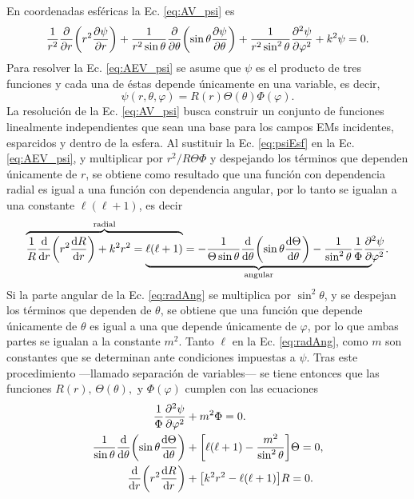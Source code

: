 En coordenadas esféricas la Ec. \eqref{eq:AV_psi} es
	\begin{equation}
	\frac{1}{r^2} \pdv{r}\qty(r^2\pdv{\psi}{r})+ 
	\frac{1}{r^2\sin\theta}\pdv{\theta}\qty(\sin\theta\pdv{\psi}{\theta})
	 + \frac{1}{r^2\sin^2\theta}\pdv[2]{\psi}{\varphi} + k^2 \psi =0. \label{eq:AEV_psi}
	\end{equation}
Para resolver la Ec. \eqref{eq:AEV_psi} se asume que $\psi$ es el producto de tres funciones y cada una de éstas depende únicamente en una variable, es decir,
	\begin{equation}
	\psi (r,\theta, \varphi) = R(r)\Theta(\theta) \Phi(\varphi). \label{eq:psiEsf}
	\end{equation}
La resolución de la Ec. \eqref{eq:AV_psi} busca construir un conjunto de funciones linealmente independientes que sean una base para los campos EMs incidentes, esparcidos y dentro de la esfera. Al sustituir la Ec. \eqref{eq:psiEsf} en la Ec. \eqref{eq:AEV_psi},  y multiplicar por $r^2/R\Theta\Phi$ y despejando los términos que dependen únicamente de $r$, se obtiene como resultado que una función con dependencia radial es igual a una función con dependencia angular, por lo tanto se igualan a una constante $\ell (\ell +1)$, es decir
	\begin{equation}
\mathrlap{\overbrace{\phantom{\frac{1}{R} \dv{r}\qty(r^2\dv{R}{r})+  k^2 r^2 = \ell (\ell +1)}}^{\text{radial}}}
									\frac{1}{R} \dv{r}\qty(r^2\dv{R}{r})+  k^2 r^2 = 
      \mathrlap{\underbrace{\phantom{\ell (\ell +1)=
									-\frac{1}{\Theta\sin\theta}\dv{\theta}\qty(\sin\theta\dv{\Theta}{\theta})
								  \frac{1}{\sin^2\theta}\frac{1}{\Phi}\pdv[2]{\psi}{\varphi} }}_{\text{angular}}}
						 \ell (\ell +1)=
						-\frac{1}{\Theta\sin\theta}\dv{\theta}\qty(\sin\theta\dv{\Theta}{\theta})
					 - \frac{1}{\sin^2\theta}\frac{1}{\Phi}\pdv[2]{\psi}{\varphi}.\label{eq:radAng}
	\end{equation}
Si la parte angular de la Ec. \eqref{eq:radAng} se multiplica por $\sin^2\theta$, y se despejan los términos que dependen de $\theta$, se obtiene que una función que depende únicamente de $\theta$ es igual a una que depende únicamente de $\varphi$, por lo que ambas partes se igualan a la constante $m^2$. Tanto $\ell$ en la Ec. \eqref{eq:radAng}, como $m$ son constantes que se determinan ante condiciones impuestas a $\psi$. Tras este procedimiento ---llamado separación de variables--- se tiene entonces que las funciones $R(r),\, \Theta(\theta), \mbox{ y } \Phi(\varphi)$ cumplen con las ecuaciones
\begin{align}
\frac{1}{\Phi}\pdv[2]{\psi}{\varphi} &+ m^2 \Phi =0. \label{eq:Phi}\\
\frac{1}{\sin\theta}\dv{\theta}\qty(\sin\theta\dv{\Theta}{\theta}) &+ \qty[\ell(\ell+1)- \frac{m^2}{\sin^2\theta}]\Theta =0,\label{eq:Theta}\\
\dv{r}\qty(r^2\dv{R}{r}) &+ \qty[ k^2 r^2 - \ell (\ell +1)] R =0. \label{eq:R}
\end{align}

